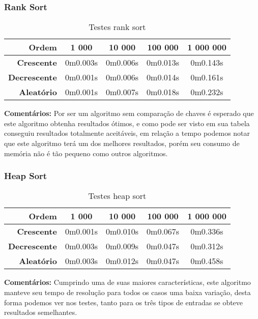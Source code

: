 \documentclass[
	12pt,				%
	oneside,			%
	a4paper,			%
	english,			%
	brazil,				%
	]{article}
\begin{document}
\subsubsection{Rank Sort}
\begin{table}[H]
\centering
\begin{tabular}{|r|c|c|c|c|}
\cline{1-5} 
 \textbf{Ordem} & \textbf{1 000} & \textbf{10 000} & \textbf{100 000} & \textbf{1 000 000}\\
 \hline
 \textbf{Crescente} & 0m0.003s & 0m0.006s & 0m0.013s & 0m0.143s \\
 \hline
 \textbf{Decrescente} & 0m0.001s & 0m0.006s & 0m0.014s & 0m0.161s \\
 \hline
 \textbf{Aleat{\'o}rio} & 0m0.001s & 0m0.007s & 0m0.018s & 0m0.232s \\
 \hline
\end{tabular} 
\caption{Testes rank sort}
\end{table}
\indent \textbf{Comentários:} Por ser um algoritmo sem comparação de chaves é esperado que este algoritmo obtenha resultados ótimos, e como pode ser visto em sua tabela
conseguiu resultados totalmente aceitáveis, em relação a tempo podemos notar que este algoritmo terá um dos melhores resultados, porém seu consumo de memória não é
tão pequeno como outros algoritmos.


\subsubsection{Heap Sort}
\begin{table}[H]
\centering
\begin{tabular}{|r|c|c|c|c|}
\cline{1-5} 
 \textbf{Ordem} & \textbf{1 000} & \textbf{10 000} & \textbf{100 000} & \textbf{1 000 000}\\
 \hline
 \textbf{Crescente} & 0m0.001s & 0m0.010s & 0m0.067s & 0m0.336s \\
 \hline
 \textbf{Decrescente} & 0m0.003s & 0m0.009s & 0m0.047s & 0m0.312s \\
 \hline
 \textbf{Aleat{\'o}rio} & 0m0.003s & 0m0.012s & 0m0.047s & 0m0.458s \\
 \hline
\end{tabular} 
\caption{Testes heap sort}
\end{table}
\indent \textbf{Comentários:} Cumprindo uma de suas maiores características, este algoritmo manteve seu tempo de resolução para todos os casos uma baixa variação, desta forma
podemos ver nos testes, tanto para os três tipos de entradas se obteve resultados semelhantes.
\end{document}
